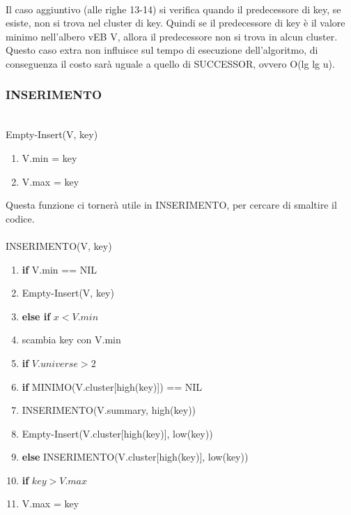 \documentclass{article}
\begin{document}
\begin{flushleft}
            ~\\Il caso aggiuntivo (alle righe 13-14) si verifica quando il predecessore di key, se esiste, non si trova nel cluster di key. Quindi se il predecessore di key è il valore minimo nell'albero vEB V, allora il predecessore non si trova in alcun cluster.\\
            Questo caso extra non influisce sul tempo di esecuzione dell'algoritmo, di conseguenza il costo sarà uguale a quello di SUCCESSOR, ovvero O(lg lg u).\\
\end{flushleft}        

\begin{flushleft}            
        \subsubsection{INSERIMENTO}
            ~\\Empty-Insert(V, key)
            \begin{enumerate}
                \item V.min = key
                \item V.max = key
            \end{enumerate}
            Questa funzione ci tornerà utile in INSERIMENTO, per cercare di smaltire il codice.\\
        
            ~\\INSERIMENTO(V, key)
            \begin{enumerate}
                \item \textbf{if} V.min == NIL
                \item \hspace{20pt} Empty-Insert(V, key)
                \item \textbf{else if} $x < V.min$
                \item \hspace{20pt} scambia key con V.min
                \item \hspace{20pt} \textbf{if} $V.universe > 2$
                \item \hspace{40pt} \textbf{if} MINIMO(V.cluster[high(key)]) == NIL
                \item \hspace{60pt} INSERIMENTO(V.summary, high(key))
                \item \hspace{60pt} Empty-Insert(V.cluster[high(key)], low(key))
                \item \hspace{40pt} \textbf{else} INSERIMENTO(V.cluster[high(key)], low(key))
                \item \hspace{20pt} \textbf{if} $key > V.max$
                \item \hspace{40pt} V.max = key
            \end{enumerate}
                

\end{flushleft}
\end{document}
